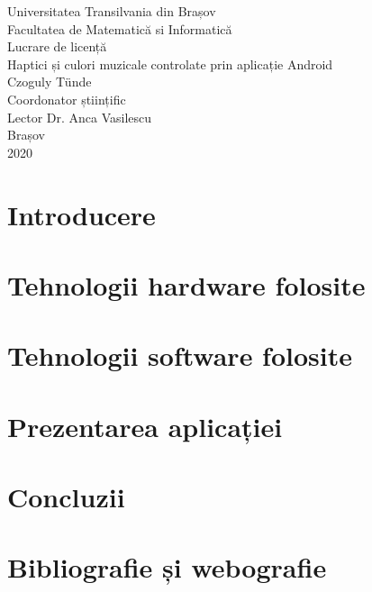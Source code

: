 \documentclass[a4paper, 12pt, titlepage]{article}
\begin{document}
\begin{titlepage}
\begin{center}
\vspace*{-3.0cm}
Universitatea Transilvania din Brașov\\Facultatea de Matematică si Informatică
\\
\vspace{5.0cm}
\LARGE Lucrare de licență 
\\
\vspace{0.3cm}
Haptici și culori muzicale controlate prin aplicație Android
\\
\vspace{4.7cm}
\large Czoguly Tünde
\\
\vspace{0.5cm}
Coordonator științific \\  Lector Dr. Anca Vasilescu
\\
\vspace{6.0cm}
\normalsize Brașov\\2020
\end{center} 
\end{titlepage}

\tableofcontents

\newpage

\listoffigures

\newpage

\section{Introducere}


\newpage

\section{Tehnologii hardware folosite}


\newpage

\section{Tehnologii software folosite}


\newpage

\section{Prezentarea aplicației}


\newpage

\section{Concluzii}

\newpage

\section{Bibliografie și webografie}


\end{document}
